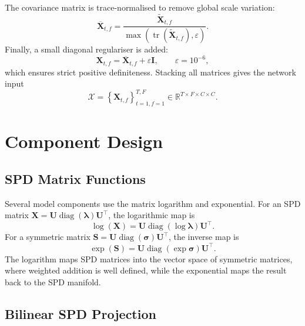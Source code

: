 The covariance matrix is trace-normalised to remove global scale variation:
\begin{equation}
    \overline{\bm{X}}_{t,f}
    =
    \frac{\widetilde{\bm{X}}_{t,f}}
         {\max\left(\operatorname{tr}
         (\widetilde{\bm{X}}_{t,f}),\varepsilon\right)}.
\end{equation}
Finally, a small diagonal regulariser is added:
\begin{equation}
    \bm{X}_{t,f}
    =
    \overline{\bm{X}}_{t,f}+\varepsilon\bm{I},
    \qquad \varepsilon=10^{-6},
\end{equation}
which ensures strict positive definiteness. Stacking all matrices gives the
network input
\begin{equation}
    \bm{\mathcal{X}}
    =
    \left\{\bm{X}_{t,f}\right\}_{t=1,f=1}^{T,F}
    \in \mathbb{R}^{T \times F \times C \times C}.
\end{equation}

\section{Component Design}
\label{sec:component-design}

\subsection{SPD Matrix Functions}

Several model components use the matrix logarithm and exponential. For an SPD
matrix $\bm{X}=\bm{U}\operatorname{diag}(\bm{\lambda})\bm{U}^{\top}$,
the logarithmic map is
\begin{equation}
    \log(\bm{X})
    =
    \bm{U}\operatorname{diag}
    \left(\log\bm{\lambda}\right)\bm{U}^{\top}.
\end{equation}
For a symmetric matrix
$\bm{S}=\bm{U}\operatorname{diag}(\bm{\sigma})\bm{U}^{\top}$, the inverse map
is
\begin{equation}
    \exp(\bm{S})
    =
    \bm{U}\operatorname{diag}
    \left(\exp\bm{\sigma}\right)\bm{U}^{\top}.
\end{equation}
The logarithm maps SPD matrices into the vector space of symmetric matrices,
where weighted addition is well defined, while the exponential maps the result
back to the SPD manifold.

\subsection{Bilinear SPD Projection}

